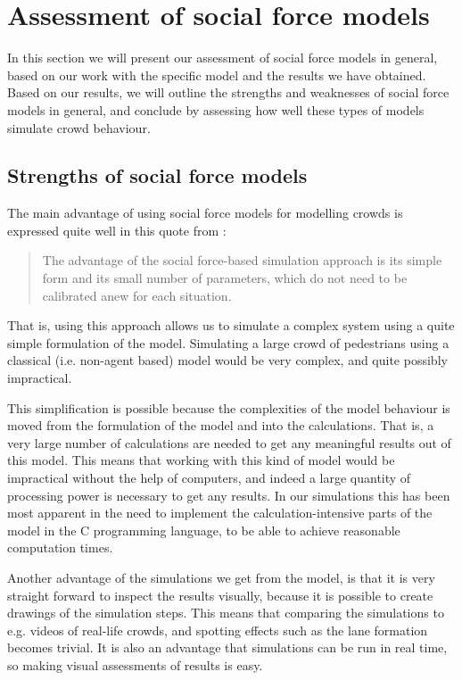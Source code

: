 \section{Assessment of social force models}
\label{sec:assessment}
In this section we will present our assessment of social force models in 
general, based on our work with the specific model and the results we have 
obtained. Based on our results, we will outline the strengths and weaknesses 
of social force models in general, and conclude by assessing how well these 
types of models simulate crowd behaviour.

\subsection{Strengths of social force models}
The main advantage of using social force models for modelling crowds is 
expressed quite well in this quote from \cite{self-org}:

\begin{quote}
    The advantage of the social force-based simulation approach is its simple 
    form and its small number of parameters, which do not need to be 
    calibrated anew for each situation.
\end{quote}

That is, using this approach allows us to simulate a complex system using a 
quite simple formulation of the model. Simulating a large crowd of pedestrians 
using a classical (i.e. non-agent based) model would be very complex, and 
quite possibly impractical.

This simplification is possible because the complexities of the model 
behaviour is moved from the formulation of the model and into the 
calculations. That is, a very large number of calculations are needed to get 
any meaningful results out of this model. This means that working with this 
kind of model would be impractical without the help of computers, and indeed a 
large quantity of processing power is necessary to get any results. In our 
simulations this has been most apparent in the need to implement the 
calculation-intensive parts of the model in the C programming language, to be 
able to achieve reasonable computation times.

Another advantage of the simulations we get from the model, is that it is very 
straight forward to inspect the results visually, because it is possible to 
create drawings of the simulation steps. This means that comparing the 
simulations to e.g. videos of real-life crowds, and spotting effects such as 
the lane formation becomes trivial. It is also an advantage that simulations 
can be run in real time, so making visual assessments of results is easy.

